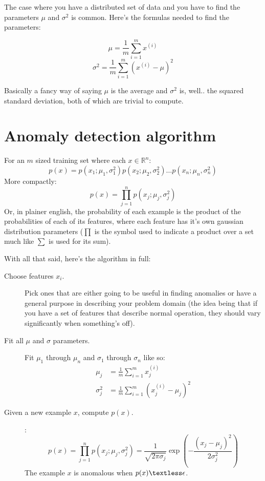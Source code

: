 The case where you have a distributed set of data and you have to find the parameters $\mu$ and $\sigma^2$ is common. Here's the formulas needed to find the parameters:

\[
\mu = \frac{1}{m}\sum^m_{i = 1}x^{(i)}
\]
\[
\sigma^2 = \frac{1}{m}\sum^m_{i = 1}(x^{(i)} - \mu)^2
\]

Basically a fancy way of saying $\mu$ is the average and $\sigma^2$ is, well.. the squared standard deviation, both of which are trivial to compute.

\section{Anomaly detection algorithm}

For an $m$ sized training set where each $x \in \mathbb{R}^n$: 
\[
p(x) = p(x_1;\mu_1, \sigma^2_1)p(x_2;\mu_2, \sigma^2_2) \dots p(x_n;\mu_n, \sigma^2_n)
\]
More compactly:
\[
p(x) = \prod^n_{j = 1}p(x_j;\mu_j, \sigma^2_j)
\]
Or, in plainer english, the probability of each example is the product of the probabilities of each of its features, where each feature has it's own gaussian distribution parameters ($\prod$ is the symbol used to indicate a product over a set much like $\sum$ is used for its sum).

With all that said, here's the algorithm in full:

\begin{description}
\item[Choose features $x_i$.] Pick ones that are either going to be useful in finding anomalies or have a general purpose in describing your problem domain (the idea being that if you have a set of features that describe normal operation, they should vary significantly when something's off).
\item[Fit all $\mu$ and 	$\sigma$ parameters.] Fit $\mu_1$ through $\mu_n$ and $\sigma_1$ through $\sigma_n$ like so:
\begin{align*}
\mu_j 				&= \frac{1}{m}\sum^m_{i = 1}x^{(i)}_j \\
\sigma^2_j 	&= \frac{1}{m}\sum^m_{i = 1}(x^{(i)}_j - \mu_j)^2
\end{align*}
\item[Given a new example $x$, compute $p(x)$.]:
\[
p(x) = \prod^n_{j = 1}p(x_j;\mu_j, \sigma^2_j) = 
\frac{1}{\sqrt{2\pi\sigma_j}}
\exp\left({-\frac{(x_j - \mu_j)^2}{2\sigma^2_j}}\right)
\]
The example $x$ is anomalous when $p(x) \textless \epsilon$.
\end{description}

